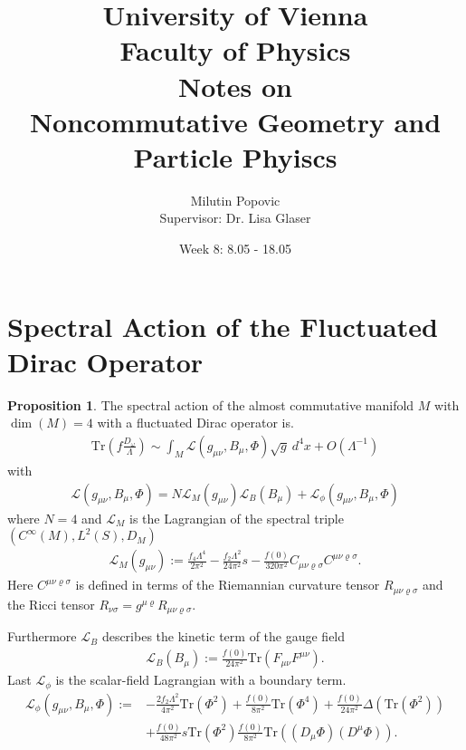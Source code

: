 \documentclass[a4paper]{article}
\title{University of Vienna\\ Faculty of Physics\\ \vspace{1.25cm}
Notes on\\ Noncommutative Geometry and Particle Phyiscs}
\author{Milutin Popovic \\ Supervisor: Dr. Lisa
Glaser}
\date{Week 8: 8.05 - 18.05}
\theoremstyle{definition}
\theoremstyle{definition}
\theoremstyle{definition}
\theoremstyle{theorem}
\theoremstyle{theorem}
\theoremstyle{theorem}
\newtheorem{proposition}{Proposition}
\begin{document}
    \maketitle
    \tableofcontents
    \newpage


\section{Spectral Action of the Fluctuated Dirac Operator}
\begin{proposition}
    The spectral action of the almost commutative manifold $M$ with $\dim(M)
    =4$ with a fluctuated Dirac operator is.
    \begin{align}
        \text{Tr}(f\frac{D_\omega}{\Lambda}) \sim \int_M \mathcal{L}(g_{\mu\nu},
         B_\mu, \Phi) \sqrt{g}\ d^4x + O(\Lambda^{-1})
    \end{align}
    with
    \begin{align}
        \mathcal{L}(g_{\mu\nu}, B_\mu, \Phi) =
        N\mathcal{L}_M(g_{\mu\nu})
        \mathcal{L}_B(B_\mu)+
        \mathcal{L}_\phi(g_{\mu\nu}, B_\mu, \Phi)
    \end{align}
    where $N=4$ and $\mathcal{L}_M$ is the Lagrangian of the spectral triple
    $(C^\infty(M) , L^2(S), D_M)$
    \begin{align}\label{lagr}
        \mathcal{L}_M(g_{\mu\nu}) := \frac{f_4 \Lambda ^4}{2\pi^2} -
        \frac{f_2 \Lambda^2}{24\pi ^2}s - \frac{f(0)}{320\pi^2} C_{\mu\nu
        \varrho \sigma}C^{\mu\nu \varrho \sigma}.
    \end{align}
    Here $C^{\mu\nu \varrho \sigma}$ is defined in terms of the Riemannian
    curvature tensor $R_{\mu\nu \varrho \sigma}$ and the Ricci tensor
    $R_{\nu\sigma} = g^{\mu\varrho} R_{\mu\nu \varrho\sigma}$.


    Furthermore $\mathcal{L}_B$ describes the kinetic term of the gauge field
    \begin{align}
        \mathcal{L}_B(B_\mu) := \frac{f(0)}{24\pi^2}
        \text{Tr}(F_{\mu\nu}F^{\mu\nu}).
    \end{align}
    Last $\mathcal{L}_\phi$ is the scalar-field Lagrangian with a boundary
    term.
    \begin{align}
        \mathcal{L}_\phi(g_{\mu\nu}, B_\mu, \Phi) :=
        &-\frac{2f_2\Lambda^2}{4\pi^2}\text{Tr}(\Phi^2) + \frac{f(0)}{8\pi^2}
        \text{Tr}(\Phi^4) + \frac{f(0)}{24\pi^2} \Delta(\text{Tr}(\Phi^2))\\
        &+ \frac{f(0)}{48\pi^2}s\text{Tr}(\Phi^2)
        \frac{f(0)}{8\pi^2}\text{Tr}((D_\mu \Phi)(D^\mu \Phi)).
    \end{align}
\end{proposition}
\end{document}
